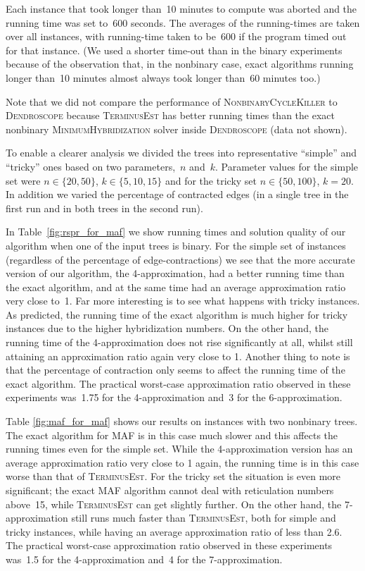 Each instance that took longer than~10 minutes to compute was aborted and the running time was set to~600 seconds. The averages of the running-times are taken over all instances, with running-time taken to be~600 if the program timed out for that instance. (We used a shorter time-out than in the binary experiments because of the observation that, in the nonbinary case, exact algorithms running longer than~10 minutes almost always took longer than~60 minutes too.)

Note that we did not compare the performance of \textsc{NonbinaryCycleKiller} to \textsc{Dendroscope} because \textsc{TerminusEst} has better running times than the exact nonbinary \textsc{MinimumHybridization} solver inside \textsc{Dendroscope} (data not shown).

To enable a clearer analysis we divided the trees into representative ``simple'' and ``tricky'' ones based on two parameters,~$n$ and~$k$. Parameter values for the simple set were $n \in \{20, 50\}$, $k \in \{5, 10, 15\}$ and for the tricky set $n \in \{50, 100\}$, $k=20$. In addition we varied the percentage of contracted edges (in a single tree in the first run and in both trees in the second run).


In Table~\ref{fig:rspr_for_maf} we show running times and solution quality of our algorithm when one of the input trees is binary. For the simple set of instances (regardless of the percentage of edge-contractions) we see that the more accurate version of our algorithm, the 4-approximation, had a better running time than the exact algorithm, and at the same time had an average approximation ratio very close to~1. Far more interesting is to see what happens with tricky instances. As predicted, the running time of the exact algorithm is much higher for tricky instances due to the higher hybridization numbers. On the other hand, the running time of the 4-approximation does not rise significantly at all, whilst still attaining an approximation ratio again very close to 1. Another thing to note is that the percentage of contraction only seems to affect the running time of the exact algorithm. The practical worst-case approximation ratio observed in these experiments was~1.75 for the 4-approximation and~3 for the 6-approximation. 


Table \ref{fig:maf_for_maf} shows our results on instances with two nonbinary trees. The exact algorithm for MAF is in this case much slower and this affects the running times even for the simple set. While the 4-approximation version has an average approximation ratio very close to 1 again, the running time is in this case worse than that of \textsc{TerminusEst}. For the tricky set the situation is even more significant; the exact MAF algorithm cannot deal with reticulation numbers above~15, while \textsc{TerminusEst} can get slightly further. On the other hand, the 7-approximation still runs much faster than \textsc{TerminusEst}, both for simple and tricky instances, while having an average approximation ratio of less than 2.6. The practical worst-case approximation ratio observed in these experiments was~1.5 for the 4-approximation and~4 for the 7-approximation. 

